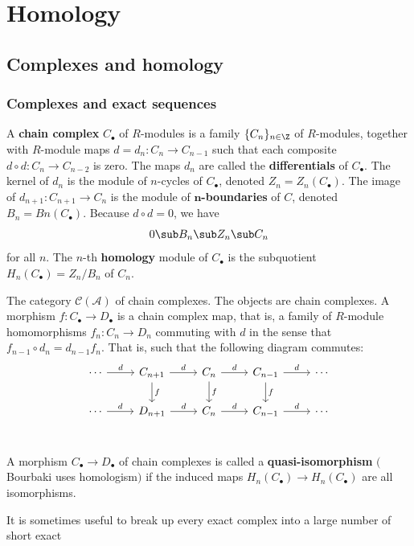 \chapter{Homology}
\section{Complexes and homology}
\subsection{Complexes and exact sequences}
\begin{definition}
A \textbf{chain complex} $C_{\bullet}$ of $R$-modules is a family $\{C_n\}_{n\in\Z}$ of $R$-modules, together with $R$-module maps $d=d_n:C_n\to C_{n-1}$ such that each composite $d\circ d:C_n\to C_{n-2}$ is zero. The maps $d_n$ are called the \textbf{differentials} of $C_{\bullet}$. The kernel of $d_n$ is the module of $n$-cycles of $C_{\bullet}$, denoted $Z_n=Z_n(C_{\bullet})$. The image of $d_{n+1}:C_{n+1}\to C_n$ is the module of \textbf{$\bm{n}$-boundaries} of $C$, denoted $B_n=Bn(C_{\bullet})$. Because $d\circ d=0$, we have
\[0\sub B_n\sub Z_n\sub C_n\]
for all $n$. The $n$-th \textbf{homology} module of $C_{\bullet}$ is the subquotient $H_n(C_{\bullet})=Z_n/B_n$ of $C_n$.
\end{definition}
\begin{definition}
The category $\mathcal{C}(\mathcal{A})$ of chain complexes. The objects are chain complexes. A morphism $f:C_{\bullet}\to D_{\bullet}$ is a chain complex map, that is, a family of $R$-module homomorphisms $f_n:C_n\to D_n$ commuting with $d$ in the sense that $f_{n-1}\circ d_n=d_{n-1}f_n$. That is, such that the following diagram commutes:
\[\begin{tikzcd}
\cdots\ar[r,"d"]&C_{n+1}\ar[d,"f"]\ar[r,"d"]&C_n\ar[d,"f"]\ar[r,"d"]&C_{n-1}\ar[d,"f"]\ar[r,"d"]&\cdots\\
\cdots\ar[r,"d"]&D_{n+1}\ar[r,"d"]&C_n\ar[r,"d"]&C_{n-1}\ar[r,"d"]&\cdots\\
\end{tikzcd}\]
\end{definition}
\begin{definition}
A morphism $C_{\bullet}\to D_{\bullet}$ of chain complexes is called a \textbf{quasi-isomorphism} $($Bourbaki uses homologism$)$ if the induced maps $H_n(C_{\bullet})\to H_n(C_{\bullet})$ are all isomorphisms.
\end{definition}
It is sometimes useful to break up every exact complex into a large number of short exact
